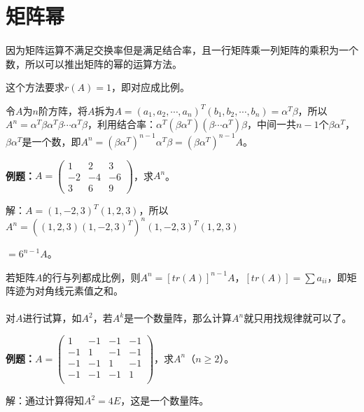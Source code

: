 \section{矩阵幂}

\paragraph{}

因为矩阵运算不满足交换率但是满足结合率，且一行矩阵乘一列矩阵的乘积为一个数，所以可以推出矩阵的幂的运算方法。

这个方法要求$r(A)=1$，即对应成比例。

令$A$为$n$阶方阵，将$A$拆为$A=(a_1,a_2,\cdots,a_n)^T(b_1,b_2,\cdots,b_n)=\alpha^T\beta$，所以$A^n=\alpha^T\beta\alpha^T\beta\cdots\alpha^T\beta$，利用结合率：$\alpha^T(\beta\alpha^T)(\beta\cdots\alpha^T)\beta$，中间一共$n-1$个$\beta\alpha^T$，$\beta\alpha^T$是一个数，即$A^n=(\beta\alpha^T)^{n-1}\alpha^T\beta=(\beta\alpha^T)^{n-1}A$。\medskip

\textbf{例题：}$A=\left(\begin{array}{ccc}
    1 & 2 & 3 \\
    -2 & -4 & -6 \\
    3 & 6 & 9
\end{array}\right)$，求$A^n$。\medskip

解：$A=(1,-2,3)^T(1,2,3)$，所以$A^n=((1,2,3)(1,-2,3)^T)^n(1,-2,3)^T(1,2,3)$

$=6^{n-1}A$。

若矩阵$A$的行与列都成比例，则$A^n=[tr(A)]^{n-1}A$，$[tr(A)]=\sum a_{ii}$，即矩阵迹为对角线元素值之和。

\paragraph{}

对$A$进行试算，如$A^2$，若$A^k$是一个数量阵，那么计算$A^n$就只用找规律就可以了。

\textbf{例题：}$A=\left(\begin{array}{cccc}
    1 & -1 & -1 & -1 \\
    -1 & 1 & -1 & -1 \\
    -1 & -1 & 1 & -1 \\
    -1 & -1 & -1 & 1 \\
\end{array}\right)$，求$A^n$（$n\geqslant2$）。\medskip

解：通过计算得知$A^2=4E$，这是一个数量阵。\medskip

